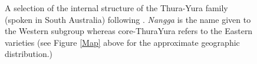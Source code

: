 	\begin{figure}[h]\centering
		\caption[\textsc{phylogeny.} Subgrouping in Thura-Yura]{A selection of the internal structure of the Thura-Yura family (spoken in South Australia) following \citealt[183]{Simpson2004}. \textit{Nangga} is the name given to the Western subgroup whereas core-ThuraYura refers to the Eastern varieties (see Figure \ref{Map} above for the approximate geographic distribution.)}\label{TY-tree}\small
	\end{figure}
